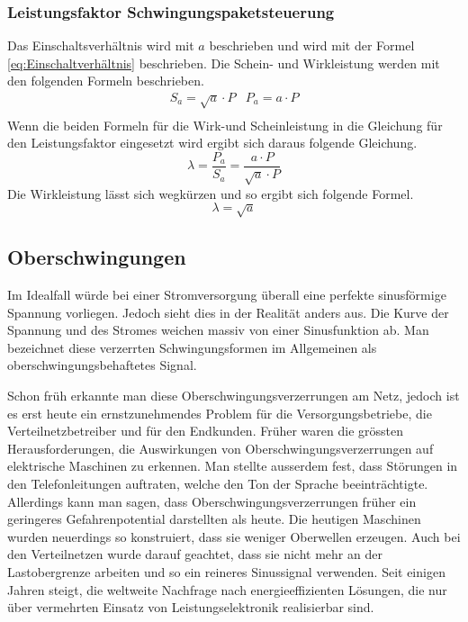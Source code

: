\subsubsection{Leistungsfaktor Schwingungspaketsteuerung}
Das Einschaltsverhältnis wird mit $a$ beschrieben und wird mit der Formel \ref{eq:Einschaltverhältnis} beschrieben.
Die Schein- und Wirkleistung werden mit den folgenden Formeln beschrieben.
\begin{equation}\label{eq:Schw_Schein-&Wirkleistung}
\begin{array}{cc} 
S_a = \sqrt{a} \cdot P  &   P_a = a \cdot P \\
\end{array}
\end{equation} 
Wenn die beiden Formeln für die Wirk-und Scheinleistung in die Gleichung für den Leistungsfaktor eingesetzt wird ergibt sich daraus folgende Gleichung.  
\begin{equation}
\lambda = \frac{P_a }{S_a} = \frac{a \cdot P}{\sqrt{a} \cdot P}
\end{equation}
Die Wirkleistung lässt sich wegkürzen und so ergibt sich folgende Formel.
\begin{equation}
\lambda = \sqrt{a}
\end{equation}

\subsection{Oberschwingungen}
Im Idealfall würde bei einer Stromversorgung überall eine perfekte sinusförmige Spannung vorliegen. Jedoch sieht dies in der Realität anders aus. Die Kurve der Spannung und des Stromes weichen massiv von einer Sinusfunktion ab. Man bezeichnet diese verzerrten Schwingungsformen im Allgemeinen als oberschwingungsbehaftetes Signal. 

Schon früh erkannte man diese Oberschwingungsverzerrungen am Netz, jedoch ist es erst heute ein ernstzunehmendes Problem für die Versorgungsbetriebe, die Verteilnetzbetreiber und für den Endkunden. Früher waren die grössten Herausforderungen, die Auswirkungen von Oberschwingungsverzerrungen auf elektrische Maschinen zu erkennen. Man stellte ausserdem fest, dass Störungen in den Telefonleitungen auftraten, welche den Ton der Sprache beeinträchtigte. Allerdings kann man sagen, dass Oberschwingungsverzerrungen früher ein geringeres Gefahrenpotential darstellten als heute. Die heutigen Maschinen wurden neuerdings so konstruiert, dass sie weniger Oberwellen erzeugen. Auch bei den Verteilnetzen wurde darauf geachtet, dass sie nicht mehr an der Lastobergrenze arbeiten und so ein reineres Sinussignal verwenden. Seit einigen Jahren steigt, die weltweite Nachfrage nach energieeffizienten Lösungen, die nur über vermehrten Einsatz von Leistungselektronik realisierbar sind. 
